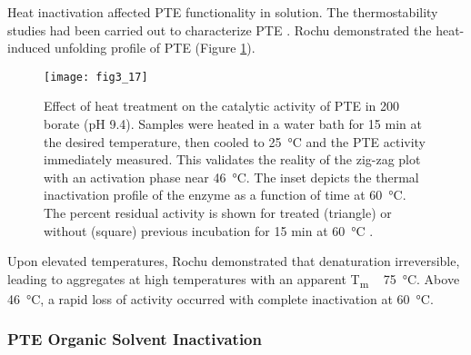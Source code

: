 \begin{refsection}
Heat inactivation affected PTE functionality in solution. The thermostability
studies had been carried out to characterize PTE
\cite{Rochu2002b,Grimsley1997b}. Rochu  demonstrated the
heat-induced unfolding profile of PTE \cite{Rochu2002b} (Figure
\ref{fig:pte-thermo-inactive}). 
\begin{figure}[htbp] \centering \texttt{[image: fig3\_17]}
    \caption[Effect of heat treatment on the catalytic activity of PTE in
    \SI{200}{\milli\Molar} borate (pH 9.4). Samples were heated in a water bath
for 15 min at the desired temperature, then cooled to \SI{25}{\celsius} and the
PTE activity immediately measured. This validates the reality of the zig-zag
plot with an activation phase near \SI{46}{\celsius}. The inset depicts the
thermal inactivation profile of the enzyme as a function of time at
\SI{60}{\celsius}. The percent residual activity is shown for treated
(triangle) or without (square) previous incubation for 15 min at
\SI{60}{\celsius}.]{Effect of heat treatment on the catalytic activity of PTE
    in \SI{200}{\milli\Molar} borate (pH 9.4). Samples were heated in a water
    bath for 15 min at the desired temperature, then cooled to
    \SI{25}{\celsius} and the PTE activity immediately measured. This validates
    the reality of the zig-zag plot with an activation phase near
    \SI{46}{\celsius}. The inset depicts the thermal inactivation profile of
    the enzyme as a function of time at \SI{60}{\celsius}. The percent
    residual activity is shown for treated (triangle) or without (square)
    previous incubation for 15 min at \SI{60}{\celsius} \cite{Rochu2002b}.}
    \label{fig:pte-thermo-inactive} 
\end{figure}

Upon elevated temperatures, Rochu  demonstrated that denaturation
irreversible, leading to aggregates at high temperatures with an apparent
T\textsubscript{m} ~ \SI{75}{\celsius}. Above \SI{46}{\celsius}, a rapid loss
of activity occurred with complete inactivation at \SI{60}{\celsius}. 

\subsubsection{PTE Organic Solvent Inactivation}


\end{refsection}
